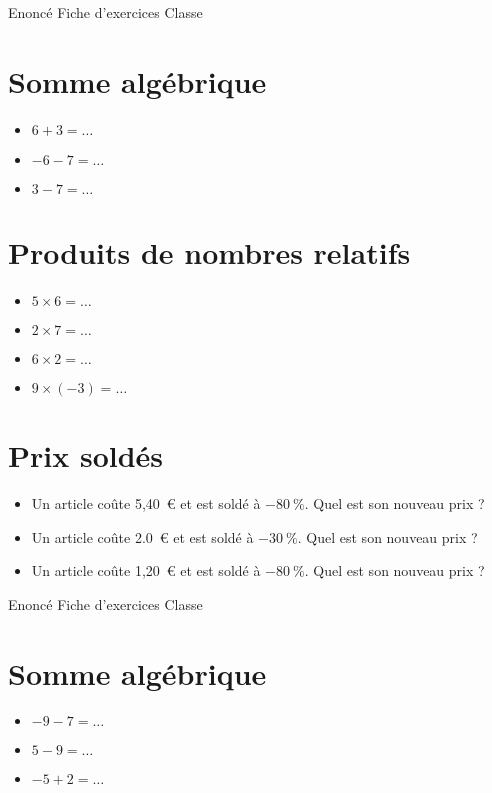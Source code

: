 \documentclass[a4paper,11pt,fleqn]{article}
\begin{document}
\pagestyle{empty}


{Enoncé} \hfill {\huge Fiche d'exercices } \hfill {Classe}

\section{Somme algébrique}
\begin{itemize}

  \item $6 +3=\ldots$
  \item $-6 -7=\ldots$
  \item $3 -7=\ldots$
\end{itemize}


\section{Produits de nombres relatifs}
\begin{itemize}

  \item $5\times6=\ldots$
  \item $2\times7=\ldots$
  \item $6\times2=\ldots$
  \item $9\times(-3)=\ldots$
\end{itemize}


\section{Prix soldés}
\begin{itemize}

  \item Un article coûte 5,40~€ et est soldé à $-80~\%$. Quel est son nouveau prix ?
  \item Un article coûte 2.0~€ et est soldé à $-30~\%$. Quel est son nouveau prix ?
  \item Un article coûte 1,20~€ et est soldé à $-80~\%$. Quel est son nouveau prix ?
\end{itemize}
\newpage
\setcounter{exo}{0}
\setcounter{section}{0}
{Enoncé} \hfill {\huge Fiche d'exercices } \hfill {Classe}

\section{Somme algébrique}
\begin{itemize}

  \item $-9 -7=\ldots$
  \item $5 -9=\ldots$
  \item $-5 +2=\ldots$
\end{itemize}
\end{document}
